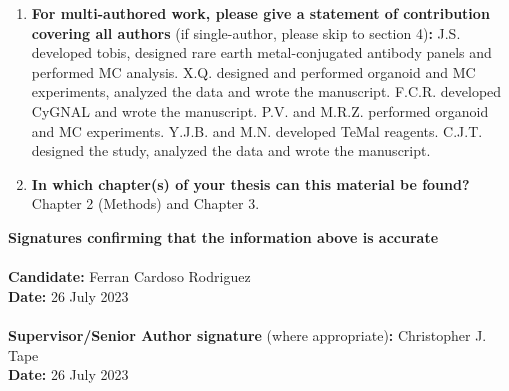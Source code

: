 \begin{enumerate}
        
        \item \textbf{For multi-authored work, please give a statement of contribution covering all authors} (if single-author, please skip to section 4)\textbf{:}
        J.S. developed \acrshort{tobis}, designed rare earth metal-conjugated antibody panels and performed MC analysis. X.Q. designed and performed organoid and MC experiments, analyzed the data and wrote the manuscript. F.C.R. developed CyGNAL and wrote the manuscript. P.V. and M.R.Z. performed organoid and MC experiments. Y.J.B. and M.N. developed TeMal reagents. C.J.T. designed the study, analyzed the data and wrote the manuscript.
        
        \item \textbf{In which chapter(s) of your thesis can this material be found?}
        Chapter 2 (Methods) and Chapter 3.
    \end{enumerate}
    
    \textbf{Signatures confirming that the information above is accurate}\\
    \textbf{}\\ 
    \textbf{Candidate:} Ferran Cardoso Rodriguez\\
    \textbf{Date:} 26 July 2023\\
    \textbf{}\\
    \textbf{Supervisor/Senior Author signature} (where appropriate)\textbf{:} Christopher J. Tape\\
    \textbf{Date:} 26 July 2023	

